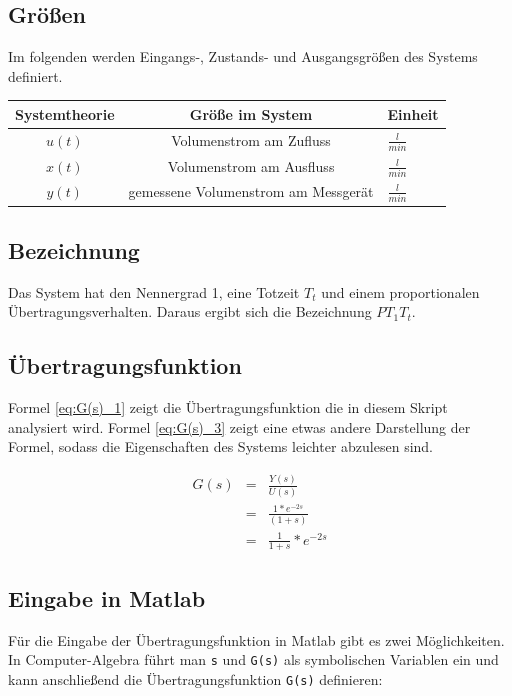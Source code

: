\subsection{Größen}
Im folgenden werden Eingangs-, Zustands- und Ausgangsgrößen des Systems definiert.
\renewcommand{\arraystretch}{1.5}
\begin{center}
    \begin{tabular}{ c|c|l } 
    Systemtheorie  & Größe im System & Einheit \\
    \hline
    $u(t)$ & Volumenstrom am Zufluss & $\frac{l}{min}$ \\ 
    $x(t)$ & Volumenstrom am Ausfluss &  $\frac{l}{min}$\\ 
    $y(t)$ & gemessene Volumenstrom am Messgerät & $\frac{l}{min}$ \\ 
    \end{tabular}
\end{center}


\subsection{Bezeichnung}
Das System hat den Nennergrad 1, eine Totzeit $T_t$ und einem proportionalen Übertragungsverhalten. Daraus ergibt sich die Bezeichnung $PT_{1}T_{t}$.

\subsection{Übertragungsfunktion}

Formel \ref{eq:G(s)_1} zeigt die Übertragungsfunktion die in diesem Skript analysiert wird. Formel \ref{eq:G(s)_3} zeigt eine etwas andere Darstellung der Formel, sodass die Eigenschaften des Systems leichter abzulesen sind.

\begin{eqnarray}
    \label{eq:G(s)_1}
    G(s) &=& \frac{Y(s)}{U(s)} \\
    \label{eq:G(s)_2}
    &=& \frac{1 * e^{-2s}}{(1+s)} \\
    \label{eq:G(s)_3}
    &=& \frac{1}{1 + s} * e^{-2s}
\end{eqnarray}

\subsection{Eingabe in Matlab}
Für die Eingabe der Übertragungsfunktion in Matlab gibt es zwei Möglichkeiten. \\
In Computer-Algebra führt man \texttt{s} und \texttt{G(s)} als symbolischen Variablen ein und kann anschließend die Übertragungsfunktion \texttt{G(s)} definieren:

